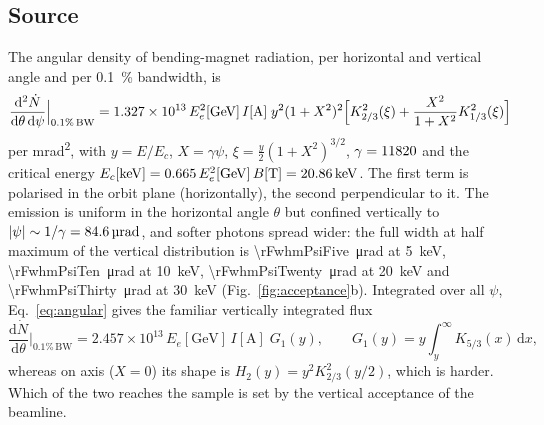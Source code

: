 \documentclass[11pt,a4paper]{article}
\newcommand{\dd}{\mathrm{d}}
\begin{document}
\subsection{Source}
The angular density of bending-magnet radiation, per horizontal and vertical angle and per
\qty{0.1}{\percent} bandwidth, is \citep{Schwinger1949,Kim1989,XDB2009}
\begin{equation}
\frac{\dd^2\dot N}{\dd\theta\,\dd\psi}\Big|_{0.1\%\,\mathrm{BW}} = 1.327\times10^{13}\,E_e^2[\mathrm{GeV}]\,I[\mathrm{A}]\;
y^2(1+X^2)^2\Bigl[K_{2/3}^2(\xi)+\frac{X^2}{1+X^2}K_{1/3}^2(\xi)\Bigr]
\label{eq:angular}
\end{equation}
per \unit{mrad^2}, with $y=E/E_c$, $X=\gamma\psi$, $\xi=\tfrac{y}{2}(1+X^2)^{3/2}$, $\gamma=11820$ and the critical energy
$E_c[\mathrm{keV}] = 0.665\,E_e^2[\mathrm{GeV}]\,B[\mathrm{T}] = \qty{20.86}{keV}$. The first term is
polarised in the orbit plane (horizontally), the second perpendicular to it. The emission is uniform
in the horizontal angle $\theta$ but confined vertically to $|\psi|\sim1/\gamma=\qty{84.6}{\micro\radian}$,
and softer photons spread wider: the full width at half maximum of the vertical distribution is
\qty{\rFwhmPsiFive}{\micro\radian} at \qty{5}{keV}, \qty{\rFwhmPsiTen}{\micro\radian} at \qty{10}{keV},
\qty{\rFwhmPsiTwenty}{\micro\radian} at \qty{20}{keV} and \qty{\rFwhmPsiThirty}{\micro\radian} at
\qty{30}{keV} (Fig.~\ref{fig:acceptance}b). Integrated over all $\psi$, Eq.~\eqref{eq:angular} gives
the familiar vertically integrated flux
\begin{equation}
\frac{\dd\dot N}{\dd\theta}\Big|_{0.1\%\,\mathrm{BW}} = 2.457\times10^{13}\,E_e[\mathrm{GeV}]\,I[\mathrm{A}]\;G_1(y),
\qquad G_1(y) = y\int_y^\infty K_{5/3}(x)\,\dd x ,
\label{eq:schwinger}
\end{equation}
whereas on axis ($X=0$) its shape is $H_2(y)=y^2K_{2/3}^2(y/2)$, which is harder. Which of the two
reaches the sample is set by the vertical acceptance of the beamline.
\end{document}
